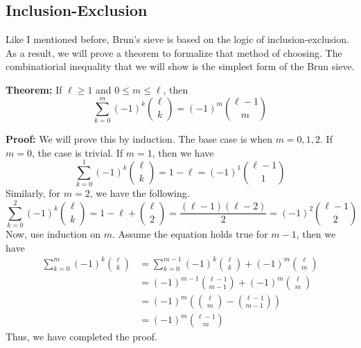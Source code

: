 \documentclass[8pt]{extarticle}
\begin{document}
\subsection{Inclusion-Exclusion}
Like I mentioned before, Brun's sieve is based on the logic of inclusion-exclusion. As a result, we will prove a theorem to formalize that method of choosing. The combinatiorial inequality that we will show is the simplest form of the Brun sieve.
\begin{boxedsection}
\textbf{Theorem:} If $\ell \geq 1$ and $0 \leq m \leq \ell$, then
$$
\sum_{k=0}^m (-1)^k {\ell \choose k}  = (-1)^m {\ell - 1 \choose m}
$$
\end{boxedsection}
\begin{boxedsection}
    \textbf{Proof:} We will prove this by induction. The base case is when $m = 0,1,2$. If $m = 0$, the case is trivial. If $m = 1$, then we have 
$$
\sum_{k=0}^1 (-1)^k {\ell \choose k} = 1 - \ell = (-1)^1 {\ell - 1 \choose 1}
$$
Similarly, for $m = 2$, we have the following.
$$
\sum_{k=0}^2 (-1)^k {\ell \choose k} = 1 - \ell + {\ell \choose 2} = \frac{(\ell-1)(\ell -2)}{2} = (-1)^2 {\ell - 1 \choose 2}
$$
Now, use induction on $m$. Assume the equation holds true for $m-1$, then we have
\begin{align*}
    \sum_{k=0}^m (-1)^k {\ell \choose k} &= \sum_{k=0}^{m-1} (-1)^k {\ell \choose k} + (-1)^m {\ell \choose m}\\
    &= (-1)^{m-1} {\ell - 1 \choose m-1} + (-1)^m {\ell \choose m}\\
    &= (-1)^m \left({\ell \choose m} - {\ell - 1 \choose m-1}\right)\\
    &= (-1)^m {\ell - 1 \choose m}
\end{align*}
Thus, we have completed the proof.
\end{boxedsection}
\pagebreak
\end{document}
